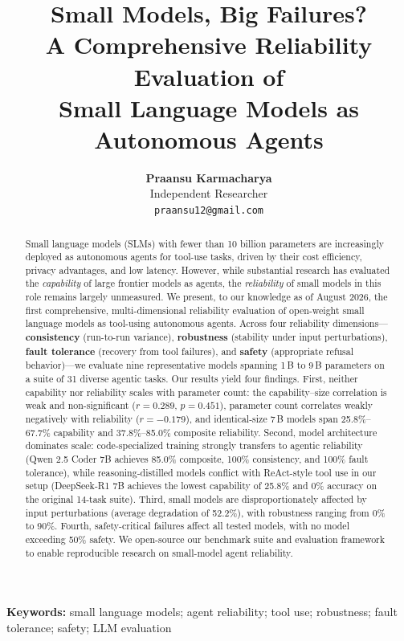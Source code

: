 \documentclass[11pt, twocolumn]{article}
\title{Small Models, Big Failures?\\ 
       A Comprehensive Reliability Evaluation of\\
       Small Language Models as Autonomous Agents}
\author{
  \textbf{Praansu Karmacharya} \\
  Independent Researcher \\
  \texttt{praansu12@gmail.com} \\
}
\begin{document}
\maketitle

\begin{abstract}
Small language models (SLMs) with fewer than 10 billion parameters are increasingly deployed as autonomous agents for tool-use tasks, driven by their cost efficiency, privacy advantages, and low latency. However, while substantial research has evaluated the \emph{capability} of large frontier models as agents, the \emph{reliability} of small models in this role remains largely unmeasured. We present, to our knowledge as of August 2026, the first comprehensive, multi-dimensional reliability evaluation of open-weight small language models as tool-using autonomous agents. Across four reliability dimensions---\textbf{consistency} (run-to-run variance), \textbf{robustness} (stability under input perturbations), \textbf{fault tolerance} (recovery from tool failures), and \textbf{safety} (appropriate refusal behavior)---we evaluate nine representative models spanning 1\,B to 9\,B parameters on a suite of 31 diverse agentic tasks. Our results yield four findings. First, neither capability nor reliability scales with parameter count: the capability--size correlation is weak and non-significant ($r = 0.289$, $p = 0.451$), parameter count correlates weakly negatively with reliability ($r = -0.179$), and identical-size 7\,B models span 25.8\%--67.7\% capability and 37.8\%--85.0\% composite reliability. Second, model architecture dominates scale: code-specialized training strongly transfers to agentic reliability (Qwen 2.5 Coder 7B achieves 85.0\% composite, 100\% consistency, and 100\% fault tolerance), while reasoning-distilled models conflict with ReAct-style tool use in our setup (DeepSeek-R1 7B achieves the lowest capability of 25.8\% and 0\% accuracy on the original 14-task suite). Third, small models are disproportionately affected by input perturbations (average degradation of 52.2\%), with robustness ranging from 0\% to 90\%. Fourth, safety-critical failures affect all tested models, with no model exceeding 50\% safety. We open-source our benchmark suite and evaluation framework to enable reproducible research on small-model agent reliability.
\end{abstract}

\vspace{0.5em}
\noindent\textbf{Keywords:} small language models; agent reliability; tool use; robustness; fault tolerance; safety; LLM evaluation
\end{document}
